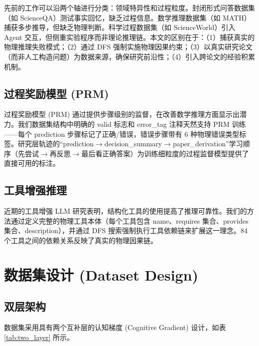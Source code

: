 \documentclass[12pt,a4paper]{article}
\begin{document}
先前的工作可以沿两个轴进行分类：领域特异性和过程粒度。封闭形式问答数据集（如 ScienceQA）测试事实回忆，缺乏过程信息。数学推理数据集（如 MATH）捕获多步推导，但缺乏物理判断。科学过程数据集（如 ScienceWorld）引入 Agent 交互，但侧重实验程序而非理论推理链。本文的区别在于：（1）捕获真实的物理推理失败模式；（2）通过 DFS 强制实施物理因果约束；（3）以真实研究论文（而非人工构造问题）为数据来源，确保研究前沿性；（4）引入跨论文的经验积累机制。

\subsection{过程奖励模型 (PRM)}

过程奖励模型 (PRM) 通过提供步骤级别的监督，在改善数学推理方面显示出潜力。我们数据集结构中明确的 valid 标志和 error\_tag 注释天然支持 PRM 训练——每个 prediction 步骤标记了正确/错误，错误步骤带有 6 种物理错误类型标签。研究层轨迹的“prediction$\rightarrow$decision\_summary$\rightarrow$paper\_derivation”学习顺序（先尝试$\rightarrow$再反思$\rightarrow$最后看正确答案）为训练细粒度的过程监督模型提供了直接可用的标注。

\subsection{工具增强推理}

近期的工具增强 LLM 研究表明，结构化工具的使用提高了推理可靠性。我们的方法通过定义完整的物理工具本体（每个工具包含 name、requires 集合、provides 集合、description），并通过 DFS 搜索强制执行工具依赖链来扩展这一理念。84 个工具之间的依赖关系反映了真实的物理因果链。

\section{数据集设计 (Dataset Design)}

\subsection{双层架构}

数据集采用具有两个互补层的认知梯度 (Cognitive Gradient) 设计，如表 \ref{tab:two_layer} 所示。
\end{document}
